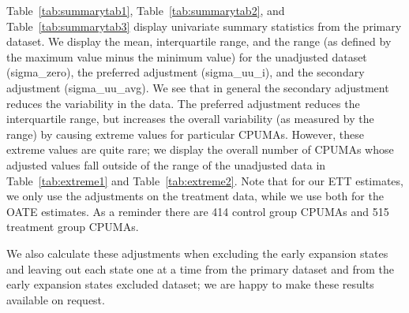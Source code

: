 \documentclass[12pt]{article}
\begin{document}
Table~\ref{tab:summarytab1}, Table~\ref{tab:summarytab2}, and Table~\ref{tab:summarytab3} display univariate summary statistics from the primary dataset. We display the mean, interquartile range, and the range (as defined by the maximum value minus the minimum value) for the unadjusted dataset (sigma\_zero), the preferred adjustment (sigma\_uu\_i), and the secondary adjustment (sigma\_uu\_avg). We see that in general the secondary adjustment reduces the variability in the data. The preferred adjustment reduces the interquartile range, but increases the overall variability (as measured by the range) by causing extreme values for particular CPUMAs. However, these extreme values are quite rare; we display the overall number of CPUMAs whose adjusted values fall outside of the range of the unadjusted data in Table~\ref{tab:extreme1} and Table~\ref{tab:extreme2}. Note that for our ETT estimates, we only use the adjustments on the treatment data, while we use both for the OATE estimates. As a reminder there are 414 control group CPUMAs and 515 treatment group CPUMAs.

We also calculate these adjustments when excluding the early expansion states and leaving out each state one at a time from the primary dataset and from the early expansion states excluded dataset; we are happy to make these results available on request. 
\end{document}
